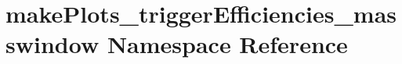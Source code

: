 \hypertarget{namespacemakePlots__triggerEfficiencies__masswindow}{
\section{makePlots\_\-triggerEfficiencies\_\-masswindow Namespace Reference}
\label{namespacemakePlots__triggerEfficiencies__masswindow}
}
